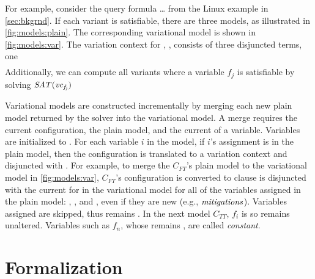 For example, consider the query formula \ldots{} from the
Linux example in \autoref{sec:bkgrnd}.
If each variant is satisfiable, there are three models, as illustrated in
\autoref{fig:models:plain}. The corresponding variational model is shown in
\autoref{fig:models:var}.
The variation context for \SatVar{}, \Satfmf{}, consists of three
disjuncted terms, one
%
\begin{align*}
\end{align*}%
%
Additionally, we can compute all variants where a variable $f_j$ is
satisfiable by solving $\mathit{SAT(\mathit{vc}_{f_j})}$

Variational models are constructed incrementally by merging each new plain model
returned by the solver into the variational model. A merge requires the current
configuration, the plain model, and the current \vc{} of a variable. Variables are
initialized to \fls{}. For each variable $i$ in the model, if $i$'s assignment
is \tru{} in the plain model, then the configuration is translated to a
variation context and disjuncted with . For example, to merge the
$C_{FT}$'s plain model to the variational model in \autoref{fig:models:var},
$C_{FT}$'s configuration is converted to %
clause is disjuncted with the current \vc{} for in the variational model
for all of the variables assigned \tru{} in the plain model: ,
, and , even if they are new (e.g.,
$\mathit{mitigations}$). Variables assigned \fls{} are skipped, thus  remains
\fls{}. In the next model $C_{TT}$, $f_{i}$ is \fls{} so  remains
unaltered. Variables such as $f_{n}$, whose \vc{} remains \fls{}, are called
\textit{constant}.

\section{Formalization}
~\label{sec:vsat:formalization}


